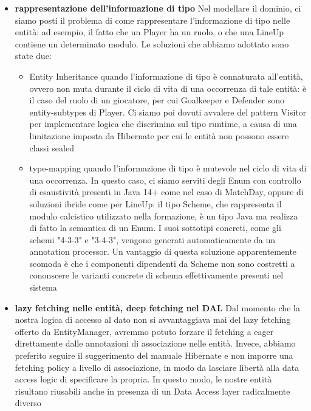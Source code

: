 \begin{itemize}
    \item \textbf{rappresentazione dell'informazione di tipo} \newline
        Nel modellare il dominio, ci siamo posti il problema di come rappresentare l'informazione
        di tipo nelle entità: ad esempio, il fatto che un Player ha un ruolo, o che una LineUp
        contiene un determinato modulo. Le soluzioni che abbiamo adottato sono state due:
         \begin{itemize}
              \item Entity Inheritance quando l'informazione di tipo è connaturata all'entità, 
                    ovvero non muta durante il ciclo di vita di una occorrenza di tale entità:
                    è il caso del ruolo di un giocatore, per cui Goalkeeper e Defender sono
                    entity-subtypes di Player. Ci siamo poi dovuti avvalere del pattern Visitor
                    per implementare logica che discrimina sul tipo runtime, a causa di una
                    limitazione imposta da Hibernate per cui le entità non possono essere
                    classi sealed
              \item type-mapping quando l'informazione di tipo è mutevole nel ciclo di vita
                    di una occorrenza. In questo caso, ci siamo serviti degli Enum con controllo
                    di esaustività presenti in Java 14+ come nel caso di MatchDay, 
                    oppure di soluzioni ibride come per LineUp: il tipo Scheme, che rappresenta 
                    il modulo calcistico
                    utilizzato nella formazione, è un tipo Java ma realizza di fatto la semantica di
                    un Enum. I suoi sottotipi concreti, come gli schemi "4-3-3" e "3-4-3", vengono generati
                    automaticamente da un annotation processor. Un vantaggio di questa soluzione 
                    apparentemente scomoda è
                    che i componenti dipendenti da Scheme non sono costretti a cononscere
                    le varianti concrete di schema effettivamente presenti nel sistema
        \end{itemize}

    \item \textbf{lazy fetching nelle entità, deep fetching nel DAL} \newline
        Dal momento che la nostra logica di accesso al dato non si avvantaggiava mai 
        del lazy fetching offerto da EntityManager, avremmo potuto forzare il fetching 
        a eager direttamente dalle annotazioni di associazione nelle entità. Invece, 
        abbiamo preferito seguire il suggerimento del manuale Hibernate e non imporre una 
        fetching policy a livello di associazione, in modo da lasciare libertà alla 
        data access logic di specificare la propria. In questo modo, le nostre entità 
        risultano riusabili anche in presenza di un Data Access layer radicalmente diverso

\end{itemize}


